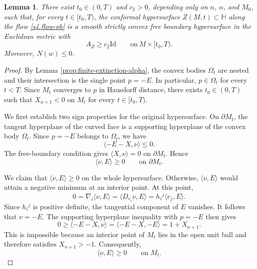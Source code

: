 \documentclass[11pt, reqno]{amsart}
\newtheorem{lemma}[theorem]{Lemma}
\theoremstyle{remark}
\theoremstyle{definition}
\numberwithin{equation}{section}
\newcommand{\HH}{\mathbb H}
\begin{document}
\begin{lemma}\label{lem:large-s-gauss-alpha}
	There exist $t_0\in(0,T)$ and $c_2>0$, depending only on $n$, $\alpha$, and $M_0$, such that, for every $t\in [t_0,T)$, the conformal hypersurface
	$Z(M,t)\subset\HH$ along the flow \eqref{s4.flow-pb} is a smooth strictly convex free boundary hypersurface in the Euclidean metric with
	\begin{equation}
		A_Z \geq c_2 \mathrm{Id} \qquad\mathrm{on}\  M\times [t_0,T).
		\label{equ-AZlowbd}
	\end{equation}
	Moreover, $N(w)\leq 0$.
\end{lemma}
\begin{proof}
By Lemma \ref{prop:finite-extinction-alpha}, the convex bodies $\Omega_t$ are nested and
their intersection is the single point $p=-E$. In particular,
$p\in\Omega_t$ for every $t<T$. Since $M_t$ converges to $p$ in
Hausdorff distance, there exists $t_0\in(0,T)$ such that $X_{n+1}<0$ on $M_t$  for every $t\in[t_0,T)$.

We first establish two sign properties for the original hypersurface. 
On $\partial M_t$, the tangent hyperplane of the curved face is a
supporting hyperplane of the convex body $\Omega_t$. Since $p=-E$
belongs to $\Omega_t$, we have
\begin{equation*}
 \langle -E-X,\nu\rangle\leq0.
\end{equation*}
The free-boundary condition gives $\langle X,\nu\rangle=0$ on
$\partial M_t$. Hence
\begin{equation*}
 \langle\nu,E\rangle\geq0
 \qquad\text{on }\partial M_t.
\end{equation*}

We claim that $\langle\nu,E\rangle\geq0$ on the whole hypersurface. Otherwise, $\langle\nu,E\rangle$
would attain a negative minimum at an interior point. At this point,
\begin{equation*}
 0=\nabla_i \langle\nu,E\rangle
   =\langle D_{e_i}\nu,E\rangle
   =h_i{}^j\langle e_j,E\rangle.
\end{equation*}
Since $h_i{}^j$ is positive definite, the tangential component of
$E$ vanishes. It follows that $\nu=-E$. The supporting hyperplane
inequality with $p=-E$ then gives
\begin{equation*}
 0\geq\langle -E-X,\nu\rangle
   =\langle -E-X,-E\rangle
   =1+X_{n+1}.
\end{equation*}
This is impossible because an interior point of $M_t$ lies in the
open unit ball and therefore satisfies $X_{n+1}>-1$. Consequently,
\begin{equation}\label{s4.nuE}
 \langle\nu,E\rangle\geq0
 \qquad\text{on }M_t.
\end{equation}


\end{proof}
\end{document}
